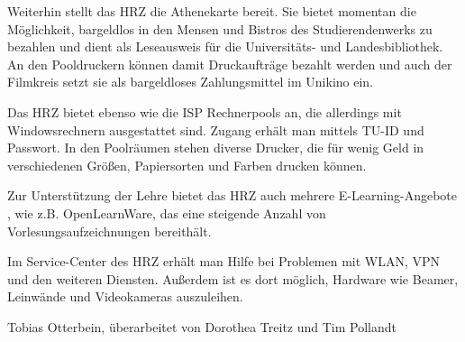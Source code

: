 {Weiterhin stellt das HRZ die Athenekarte \footnotemark[13] bereit. Sie bietet momentan die Möglichkeit, bargeldlos in den Mensen und Bistros des Studierendenwerks zu bezahlen und dient als Leseausweis für die Universitäts- und Landesbibliothek. An den Pooldruckern können damit Druckaufträge bezahlt werden und auch der Filmkreis setzt sie als bargeldloses Zahlungsmittel im Unikino ein.

Das HRZ bietet ebenso wie die ISP Rechnerpools an, die allerdings mit Windowsrechnern ausgestattet sind. Zugang erhält man mittels TU-ID und Passwort. In den Poolräumen stehen diverse Drucker, die für wenig Geld in verschiedenen Größen, Papiersorten und Farben drucken können.

Zur Unterstützung der Lehre bietet das HRZ auch mehrere E-Learning-Angebote \footnotemark[14], wie z.B. OpenLearnWare, das eine steigende Anzahl von Vorlesungsaufzeichnungen bereithält.

Im Service-Center des HRZ \footnotemark[15] erhält man Hilfe bei Problemen mit WLAN, VPN und den weiteren Diensten. Außerdem ist es dort möglich, Hardware wie Beamer, Leinwände und Videokameras auszuleihen.
}
{Tobias Otterbein, überarbeitet von Dorothea Treitz und Tim Pollandt}


\newpage
